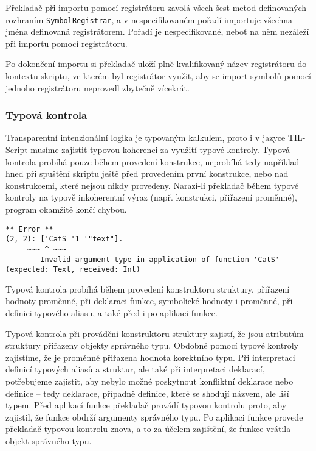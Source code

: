 Překladač při importu pomocí registrátoru zavolá všech šest metod definovaných rozhraním
\lstinline{SymbolRegistrar}, a v nespecifikovaném pořadí importuje všechna jména definovaná
registrátorem. Pořadí je nespecifikované, neboť na něm nezáleží při importu pomocí registrátoru.

Po dokončení importu si překladač uloží plně kvalifikovaný název registrátoru do kontextu skriptu,
ve kterém byl registrátor využit, aby se import symbolů pomocí jednoho registrátoru neprovedl
zbytečně vícekrát.

\subsubsection{Typová kontrola}

Transparentní intenzionální logika je typovaným kalkulem, proto i v jazyce TIL-Script musíme
zajistit typovou koherenci za využití typové kontroly. Typová kontrola probíhá pouze během provedení
konstrukce, neprobíhá tedy například hned při spuštění skriptu ještě před provedením první
konstrukce, nebo nad konstrukcemi, které nejsou nikdy provedeny. Narazí-li překladač během typové
kontroly na typově inkoherentní výraz (např. konstrukci, přiřazení proměnné), program okamžitě
končí chybou.

\begin{lstlisting}[caption={Příklad hlášení chyby}]
  ** Error **
(2, 2): ['CatS '1 '"text"].
     ~~~ ^ ~~~
        Invalid argument type in application of function 'CatS' (expected: Text, received: Int)
\end{lstlisting}

Typová kontrola probíhá během provedení konstruktoru struktury, přiřazení hodnoty proměnné, při
deklaraci funkce, symbolické hodnoty i proměnné, při definici typového aliasu, a také před i
po aplikaci funkce.

Typová kontrola při provádění konstruktoru struktury zajistí, že jsou atributům struktury přiřazeny
objekty správného typu. Obdobně pomocí typové kontroly zajistíme, že je proměnné přiřazena hodnota
korektního typu. Při interpretaci definicí typových aliasů a struktur, ale také při interpretaci
deklarací, potřebujeme zajistit, aby nebylo možné poskytnout konfliktní deklarace nebo definice
-- tedy deklarace, případně definice, které se shodují názvem, ale liší typem. Před aplikací funkce
překladač provádí typovou kontrolu proto, aby zajistil, že funkce obdrží argumenty správného typu.
Po aplikaci funkce provede překladač typovou kontrolu znova, a to za účelem zajištění, že funkce
vrátila objekt správného typu.

